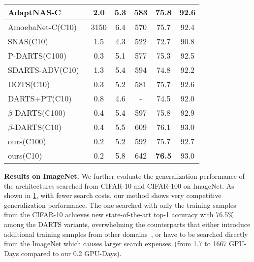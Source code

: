 \documentclass[10pt,twocolumn,letterpaper]{article}
\newcommand{\mypara}[1]{\vspace{1mm}\noindent\textbf{#1}}
\begin{document}
\begin{table}
{\begin{tabular}{lccccc}
    AdaptNAS-C~\cite{Li_2020_AdaptNAS_nips}                                       & 2.0           & 5.3       & 583     & 75.8    & 92.6    \\ 
    \midrule
    AmoebaNet-C(C10)~\cite{Real_Aggarwal_Huang_Le_2019_AmoebaNet}                                      & 3150          & 6.4       & 570     & 75.7    & 92.4   \\
    SNAS(C10)~\cite{xie2018snas}                                             & 1.5           & 4.3       & 522     & 72.7    & 90.8   \\
    P-DARTS(C100)~\cite{Chen_2019_pdarts}                                         & 0.3           & 5.1       & 577     & 75.3    & 92.5   \\
    SDARTS-ADV(C10)~\cite{chen_2020_sdarts}                                       & 1.3           & 5.4       & 594     & 74.8    & 92.2   \\
    DOTS(C10)~\cite{Gu_2021_dots}                                             & 0.3           & 5.2       & 581     & 75.7    & 92.6   \\
    DARTS+PT(C10)~\cite{wang_2021_rethinking}                                         & 0.8           & 4.6       & -       & 74.5    & 92.0    \\
    $\beta$-DARTS(C100)~\cite{ye_2022_beta}                    & 0.4                           & 5.4       & 597     & 75.8    & 92.9     \\
    $\beta$-DARTS(C10)~\cite{ye_2022_beta}                    & 0.4                           & 5.5       & 609     & 76.1    & 93.0     \\
    \midrule
    ours(C100)                                            & 0.2           & 5.2       & 592     &  75.7   & 92.7 \\       
    ours(C10)                                             & 0.2           & 5.8       & 642     &  \textbf{76.5}   & 93.0     \\  
    \bottomrule
  \end{tabular}
  }
  \label{tab:results_img}
  \vspace{-6pt}
\end{table} 
\mypara{Results on ImageNet.}
We further evaluate the generalization performance of the architectures searched from CIFAR-10 and CIFAR-100 on ImageNet.
As shown in \cref{tab:results_img}, with fewer search costs, our method shows very competitive generalization performance.
The one searched with only the training samples from the CIFAR-10 achieves new state-of-the-art top-1 accuracy with 76.5\% among the DARTS variants, 
overwhelming the counterparts that either introduce additional training samples from other domains~\cite{Li_2020_AdaptNAS_nips}, 
or have to be searched directly from the ImageNet which causes larger search expenses~(from 1.7 to 1667 GPU-Days compared to our 0.2 GPU-Days).
\end{document}
